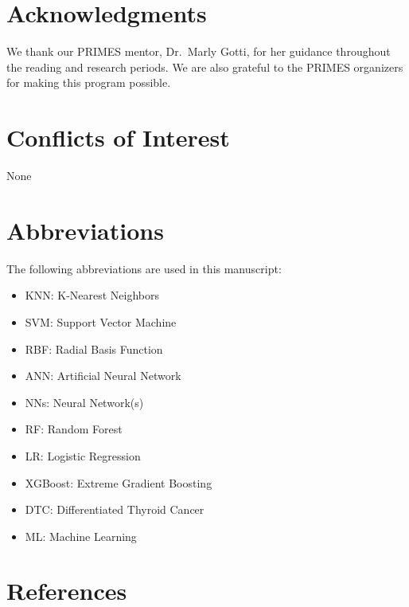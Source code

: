 \documentclass[
  letterpaper,
  DIV=11,
  numbers=noendperiod]{scrartcl}
\providecommand{\tightlist}{%
  \setlength{\itemsep}{0pt}\setlength{\parskip}{0pt}}\usepackage{longtable,booktabs,array}
\begin{document}
\section{Acknowledgments}\label{acknowledgments}

We thank our PRIMES mentor, Dr.~Marly Gotti, for her guidance throughout
the reading and research periods. We are also grateful to the PRIMES
organizers for making this program possible.

\section{Conflicts of Interest}\label{conflicts-of-interest}

None

\section{Abbreviations}\label{abbreviations}

The following abbreviations are used in this manuscript:

\begin{itemize}
\tightlist
\item
  KNN: K-Nearest Neighbors
\item
  SVM: Support Vector Machine
\item
  RBF: Radial Basis Function
\item
  ANN: Artificial Neural Network
\item
  NNs: Neural Network(s)
\item
  RF: Random Forest
\item
  LR: Logistic Regression
\item
  XGBoost: Extreme Gradient Boosting
\item
  DTC: Differentiated Thyroid Cancer
\item
  ML: Machine Learning
\end{itemize}

\section*{References}\label{references}
\end{document}

